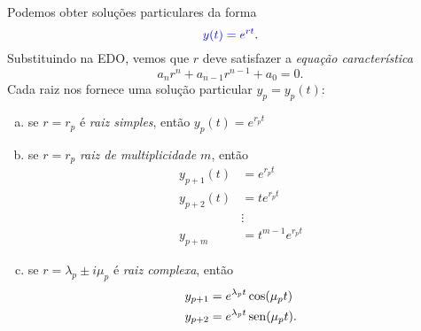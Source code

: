 Podemos obter soluções particulares da forma
\begin{equation}
  {\color{blue}y(t) = e^{rt}}.
\end{equation}
Substituindo na EDO, vemos que $r$ deve satisfazer a \emph{equação característica}
\begin{equation}
  a_nr^n + a_{n-1}r^{n-1} + a_0 = 0.
\end{equation}
Cada raiz nos fornece uma solução particular $y_p=y_p(t)$:
\begin{enumerate}[a)]
\item se $r = r_p$ é \emph{raiz simples}, então
  $y_p(t) = e^{r_pt}$
\item se $r = r_p$ \emph{raiz de multiplicidade $m$}, então
  \begin{align}
    y_{p+1}(t) &= e^{r_pt} \\
    y_{p+2}(t) &= te^{r_pt} \\
           &\vdots \\
    y_{p+m} &= t^{m-1}e^{r_pt}
  \end{align}
\item se $r = \lambda_p\pm i\mu_p$ é \emph{raiz complexa}, então
  \begin{align}
    y_{p+1} &= e^{\lambda_pt}\cos(\mu_pt) \\
    y_{p+2} &= e^{\lambda_pt}\operatorname{sen}(\mu_pt).
  \end{align}
\end{enumerate}


